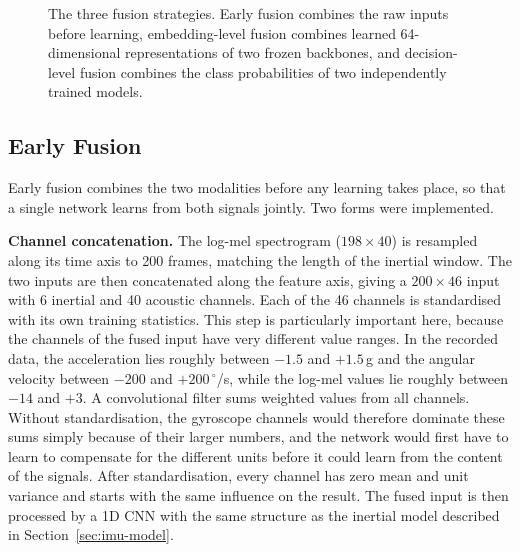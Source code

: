 \begin{figure}[htbp]
{}
\caption{The three fusion strategies. Early fusion combines the raw inputs before
learning, embedding-level fusion combines learned 64-dimensional representations
of two frozen backbones, and decision-level fusion combines the class
probabilities of two independently trained models.}
\label{fig:fusion-overview}
\end{figure}

\subsection{Early Fusion}
\label{sec:early-fusion}

Early fusion combines the two modalities before any learning takes place, so
that a single network learns from both signals jointly. Two forms were
implemented.

\textbf{Channel concatenation.} The log-mel spectrogram ($198 \times 40$) is
resampled along its time axis to 200 frames, matching the length of the inertial
window. The two inputs are then concatenated along the feature axis, giving a
$200 \times 46$ input with 6 inertial and 40 acoustic channels. Each of the 46
channels is standardised with its own training statistics. This step is
particularly important here, because the channels of the fused input have very
different value ranges. In the recorded data, the acceleration lies roughly
between $-1.5$ and $+1.5$\,g and the angular velocity between $-200$ and
$+200\,^\circ$/s, while the log-mel values lie roughly between $-14$ and $+3$. A
convolutional filter sums weighted values from all channels. Without
standardisation, the gyroscope channels would therefore dominate these sums
simply because of their larger numbers, and the network would first have to learn
to compensate for the different units before it could learn from the content of
the signals. After standardisation, every channel has zero mean and unit variance
and starts with the same influence on the result. The fused input is then
processed by a 1D CNN with the same structure as the inertial model described in
Section~\ref{sec:imu-model}.

